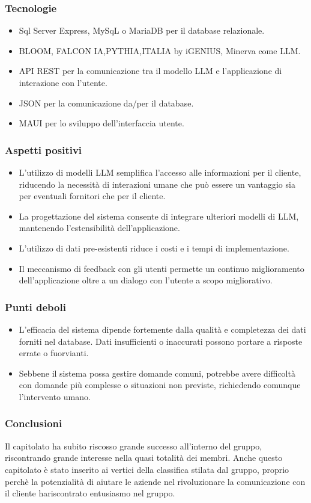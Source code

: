    \subsubsection{Tecnologie}
        \begin{itemize}
            \item Sql Server Express, MySqL o MariaDB per il database relazionale.
            \item BLOOM, FALCON IA,PYTHIA,ITALIA by iGENIUS, Minerva come LLM.
            \item API REST per la comunicazione tra il modello LLM e l’applicazione di interazione con l’utente.
            \item JSON per la comunicazione da/per il database.
            \item MAUI per lo sviluppo dell’interfaccia  utente.
        \end{itemize}
    \subsubsection{Aspetti positivi}
        \begin{itemize}
            \item L’utilizzo di modelli LLM semplifica l’accesso alle informazioni per il cliente, riducendo la necessità di interazioni umane che può essere un vantaggio sia per eventuali fornitori che per il cliente.
            \item La progettazione del sistema consente di integrare ulteriori modelli di LLM, mantenendo l’estensibilità dell’applicazione.
            \item L’utilizzo di dati pre-esistenti riduce i costi e i tempi di implementazione.
            \item Il meccanismo di feedback con gli utenti permette un continuo miglioramento dell’applicazione oltre a un dialogo con l’utente a scopo migliorativo.
        \end{itemize}
    \subsubsection{Punti deboli}
    \begin{itemize}
            \item L'efficacia del sistema dipende fortemente dalla qualità e completezza dei dati forniti nel database. Dati insufficienti o inaccurati possono portare a risposte errate o fuorvianti.
            \item Sebbene il sistema possa gestire domande comuni, potrebbe avere difficoltà con domande più complesse o situazioni non previste, richiedendo comunque l'intervento umano.
        \end{itemize}
    \subsubsection{Conclusioni}
    Il capitolato ha subito riscosso grande successo all’interno del gruppo, riscontrando grande interesse nella quasi totalità dei membri.  Anche questo capitolato è stato inserito ai vertici della classifica stilata dal gruppo, proprio perchè la potenzialità di aiutare le aziende nel rivoluzionare la comunicazione con il cliente hariscontrato entusiasmo nel gruppo.
